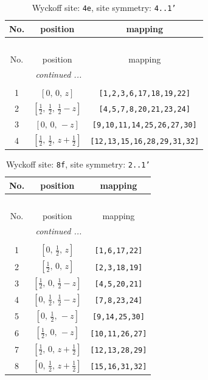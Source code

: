 \documentclass[fleqn,8pt]{jsarticle}
\begin{document}
\renewcommand{\arraystretch}{1.2}
\begin{longtable}{ccc}
\caption{Wyckoff site: {\tt 4e}, site symmetry: {\tt 4..1'}}
 \\
 \hline \hline
No. & position & mapping \\ \hline \endfirsthead

\multicolumn{2}{l}{\tablename\ \thetable{}} \\
 \hline \hline
No. & position & mapping \\ \hline \endhead

 \hline \hline
\multicolumn{2}{r}{\footnotesize\it continued ...} \\ \endfoot

 \hline \hline
\multicolumn{2}{r}{} \\ \endlastfoot

1 & $\left[ 0,\, 0,\, z \right]$ & {\tt [1,2,3,6,17,18,19,22]} \\ \hline
2 & $\left[ \frac{1}{2},\, \frac{1}{2},\, \frac{1}{2} - z \right]$ & {\tt [4,5,7,8,20,21,23,24]} \\ \hline
3 & $\left[ 0,\, 0,\, - z \right]$ & {\tt [9,10,11,14,25,26,27,30]} \\ \hline
4 & $\left[ \frac{1}{2},\, \frac{1}{2},\, z + \frac{1}{2} \right]$ & {\tt [12,13,15,16,28,29,31,32]} \\
\end{longtable}
\renewcommand{\arraystretch}{1.2}
\begin{longtable}{ccc}
\caption{Wyckoff site: {\tt 8f}, site symmetry: {\tt 2..1'}}
 \\
 \hline \hline
No. & position & mapping \\ \hline \endfirsthead

\multicolumn{2}{l}{\tablename\ \thetable{}} \\
 \hline \hline
No. & position & mapping \\ \hline \endhead

 \hline \hline
\multicolumn{2}{r}{\footnotesize\it continued ...} \\ \endfoot

 \hline \hline
\multicolumn{2}{r}{} \\ \endlastfoot

1 & $\left[ 0,\, \frac{1}{2},\, z \right]$ & {\tt [1,6,17,22]} \\ \hline
2 & $\left[ \frac{1}{2},\, 0,\, z \right]$ & {\tt [2,3,18,19]} \\ \hline
3 & $\left[ \frac{1}{2},\, 0,\, \frac{1}{2} - z \right]$ & {\tt [4,5,20,21]} \\ \hline
4 & $\left[ 0,\, \frac{1}{2},\, \frac{1}{2} - z \right]$ & {\tt [7,8,23,24]} \\ \hline
5 & $\left[ 0,\, \frac{1}{2},\, - z \right]$ & {\tt [9,14,25,30]} \\ \hline
6 & $\left[ \frac{1}{2},\, 0,\, - z \right]$ & {\tt [10,11,26,27]} \\ \hline
7 & $\left[ \frac{1}{2},\, 0,\, z + \frac{1}{2} \right]$ & {\tt [12,13,28,29]} \\ \hline
8 & $\left[ 0,\, \frac{1}{2},\, z + \frac{1}{2} \right]$ & {\tt [15,16,31,32]} \\
\end{longtable}
\end{document}
